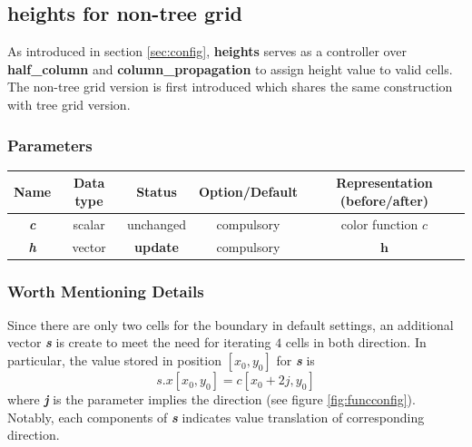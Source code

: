\documentclass[a4paper]{article}
\newcommand{\func}[1]{\textbf{\textcolor{function}{#1}}}
\newcommand{\para}[1]{\textbf{\emph{\textcolor{para}{#1}}}}
\begin{document}
\subsection{\func{heights} for non-tree grid}
As introduced in section \ref{sec:config}, \func{heights} serves as a controller over \func{half\_column} and \func{column\_propagation} to assign height value to valid cells. The non-tree grid version is first introduced which shares the same construction with tree grid version.

\subsubsection{Parameters}
\begin{center}
  \begin{tabular}{|c|c|c|c|c|}
    \hline
    Name & Data type & Status & Option/Default & Representation (before/after)\\[0.5ex]
    \hline\hline
    \para{c} & scalar & unchanged & compulsory & color function $c$\\
    \hline
    \rowcolor{output}\para{h} & vector & \textbf{update} & compulsory & $\mathbf{h}$\\
    \hline
  \end{tabular}
\end{center}

\subsubsection{Worth Mentioning Details}
Since there are only two cells for the boundary in default settings, an additional vector \para{s} is create to meet the need for iterating $4$ cells in both direction. In particular, the value stored in position $[x_0,y_0]$ for \para{s} is
\begin{equation}\label{equ:translation}
    s.x[x_0,y_0] = c[x_0+2j,y_0]
\end{equation}
where \para{j} is the parameter implies the direction (see figure \ref{fig:funcconfig}). Notably, each components of \para{s} indicates value translation of corresponding direction.
\end{document}
